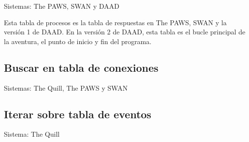 \documentclass[11pt, a5paper]{article}
\newcommand{\quill}{\textsf{The Quill}\xspace}
\newcommand{\paw}{\textsf{The PAWS}\xspace}
\newcommand{\swan}{\textsf{SWAN}\xspace}
\newcommand{\daad}{\textsf{DAAD}\xspace}
\newcommand{\sistema}[1]{\noindent Sistema: #1 \nopagebreak}
\newcommand{\sistemas}[1]{\noindent Sistemas: #1 \nopagebreak}
\begin{document}
\sistemas{\paw, \swan y \daad}

Esta tabla de procesos es la tabla de respuestas en \paw, \swan y la versión 1 de \daad. En la versión 2 de \daad, esta tabla es el bucle principal de la aventura, el punto de inicio y fin del programa.

\subsection{Buscar en tabla de conexiones}

\sistemas{\quill, \paw y \swan}

\subsection{Iterar sobre tabla de eventos}

\sistema{\quill}
\end{document}
